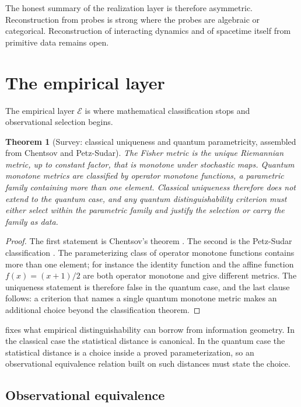 \documentclass[11pt,letterpaper]{article}
\newtheorem{theorem}{Theorem}[section]
\theoremstyle{definition}
\begin{document}
The honest summary of the realization layer is therefore asymmetric. Reconstruction from probes is strong where the probes are algebraic or categorical. Reconstruction of interacting dynamics and of spacetime itself from primitive data remains open.

\section{The empirical layer}
\label{sec:empirical}

The empirical layer $\mathcal{E}$ is where mathematical classification stops and observational selection begins.

\begin{theorem}[Survey: classical uniqueness and quantum parametricity, assembled from Chentsov and Petz-Sudar]
\label{thm:monotone}
The Fisher metric is the unique Riemannian metric, up to constant factor, that is monotone under stochastic maps. Quantum monotone metrics are classified by operator monotone functions, a parametric family containing more than one element. Classical uniqueness therefore does not extend to the quantum case, and any quantum distinguishability criterion must either select within the parametric family and justify the selection or carry the family as data.
\end{theorem}

\begin{proof}
The first statement is Chentsov's theorem \cite{corpus-52}. The second is the Petz-Sudar classification \cite{corpus-52}. The parameterizing class of operator monotone functions contains more than one element; for instance the identity function and the affine function $f(x) = (x+1)/2$ are both operator monotone and give different metrics. The uniqueness statement is therefore false in the quantum case, and the last clause follows: a criterion that names a single quantum monotone metric makes an additional choice beyond the classification theorem.
\end{proof}

 fixes what empirical distinguishability can borrow from information geometry. In the classical case the statistical distance is canonical. In the quantum case the statistical distance is a choice inside a proved parameterization, so an observational equivalence relation built on such distances must state the choice.

\subsection{Observational equivalence}
\end{document}
